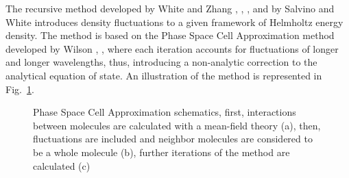 \documentclass[preprint,12pt,3p]{elsarticle}
\begin{document}
The recursive method developed by White and Zhang \citep{white1993renormalization}, \citep{white1995renormalization}, \citep{white1998renormalization}, and by Salvino and White \citep{salvino1992calculation} introduces density fluctuations to a given framework of Helmholtz energy density.
The method is based on the Phase Space Cell Approximation method developed by Wilson \citep{wilson1971renormalization}, \citep{wilson1971brenormalization}, where each iteration accounts for fluctuations of longer and longer wavelengths, thus, introducing a non-analytic correction to the analytical equation of state.
An illustration of the method is represented in Fig.~\ref{fig:schematics}.

\begin{figure}[h!]
\centering
\captionsetup{justification=centering}
\caption{Phase Space Cell Approximation schematics, first, interactions between molecules are calculated with a mean-field theory (a), then, fluctuations are included and neighbor molecules are considered to be a whole molecule (b), further iterations of the method are calculated (c)}
\label{fig:schematics}
\end{figure}
\end{document}
